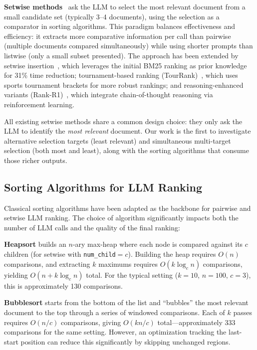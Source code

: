 \textbf{Setwise methods}~\citep{zhuang2024setwise} ask the LLM to select the most relevant document from a small candidate set (typically 3--4 documents), using the selection as a comparator in sorting algorithms. This paradigm balances effectiveness and efficiency: it extracts more comparative information per call than pairwise (multiple documents compared simultaneously) while using shorter prompts than listwise (only a small subset presented). The approach has been extended by setwise insertion~\citep{podolak2025beyond}, which leverages the initial BM25 ranking as prior knowledge for 31\% time reduction; tournament-based ranking (TourRank)~\citep{chen2025tourrank}, which uses sports tournament brackets for more robust rankings; and reasoning-enhanced variants (Rank-R1)~\citep{zhuang2025rankr1}, which integrate chain-of-thought reasoning via reinforcement learning.

All existing setwise methods share a common design choice: they only ask the LLM to identify the \emph{most relevant} document. Our work is the first to investigate alternative selection targets (least relevant) and simultaneous multi-target selection (both most and least), along with the sorting algorithms that consume those richer outputs.

\subsection{Sorting Algorithms for LLM Ranking}

Classical sorting algorithms have been adapted as the backbone for pairwise and setwise LLM ranking. The choice of algorithm significantly impacts both the number of LLM calls and the quality of the final ranking:

\textbf{Heapsort} builds an $n$-ary max-heap where each node is compared against its $c$ children (for setwise with \texttt{num\_child}$=c$). Building the heap requires $O(n)$ comparisons, and extracting $k$ maximums requires $O(k \log_c n)$ comparisons, yielding $O(n + k \log_c n)$ total. For the typical setting ($k=10$, $n=100$, $c=3$), this is approximately 130 comparisons.

\textbf{Bubblesort} starts from the bottom of the list and ``bubbles'' the most relevant document to the top through a series of windowed comparisons. Each of $k$ passes requires $O(n/c)$ comparisons, giving $O(kn/c)$ total---approximately 333 comparisons for the same setting. However, an optimization tracking the last-start position can reduce this significantly by skipping unchanged regions.

